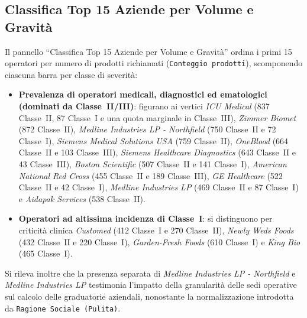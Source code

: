 \subsection{Classifica Top 15 Aziende per Volume e Gravità}
Il pannello ``Classifica Top 15 Aziende per Volume e Gravità'' ordina i primi 15 operatori per numero di prodotti richiamati (\texttt{Conteggio prodotti}), scomponendo ciascuna barra per classe di severità:
\begin{itemize}
    \item \textbf{Prevalenza di operatori medicali, diagnostici ed ematologici (dominati da Classe~II/III)}: figurano ai vertici \textit{ICU Medical} (837 Classe~II, 87 Classe~I e una quota marginale in Classe~III), \textit{Zimmer Biomet} (872 Classe~II), \textit{Medline Industries LP - Northfield} (750 Classe~II e 72 Classe~I), \textit{Siemens Medical Solutions USA} (759 Classe~II), \textit{OneBlood} (664 Classe~II e 103 Classe~III), \textit{Siemens Healthcare Diagnostics} (643 Classe~II e 43 Classe~III), \textit{Boston Scientific} (507 Classe~II e 141 Classe~I), \textit{American National Red Cross} (455 Classe~II e 189 Classe~III), \textit{GE Healthcare} (522 Classe~II e 42 Classe~I), \textit{Medline Industries LP} (469 Classe~II e 87 Classe~I) e \textit{Aidapak Services} (538 Classe~II).
    \item \textbf{Operatori ad altissima incidenza di Classe~I}: si distinguono per criticità clinica \textit{Customed} (412 Classe~I e 270 Classe~II), \textit{Newly Weds Foods} (432 Classe~II e 220 Classe~I), \textit{Garden-Fresh Foods} (610 Classe~I) e \textit{King Bio} (465 Classe~I).
\end{itemize}
Si rileva inoltre che la presenza separata di \textit{Medline Industries LP - Northfield} e \textit{Medline Industries LP} testimonia l'impatto della granularità delle sedi operative sul calcolo delle graduatorie aziendali, nonostante la normalizzazione introdotta da \texttt{Ragione Sociale (Pulita)}.


